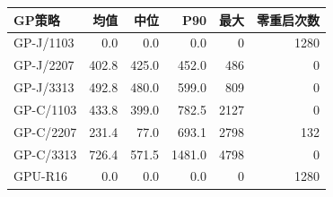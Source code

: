 \begin{tabular}{@{}lrrrrr@{}}
\toprule
GP策略 & 均值 & 中位 & P90 & 最大 & 零重启次数 \\ \midrule
GP-J/1103 & 0.0 & 0.0 & 0.0 & 0 & 1280 \\
GP-J/2207 & 402.8 & 425.0 & 452.0 & 486 & 0 \\
GP-J/3313 & 492.8 & 480.0 & 599.0 & 809 & 0 \\
GP-C/1103 & 433.8 & 399.0 & 782.5 & 2127 & 0 \\
GP-C/2207 & 231.4 & 77.0 & 693.1 & 2798 & 132 \\
GP-C/3313 & 726.4 & 571.5 & 1481.0 & 4798 & 0 \\
GPU-R16 & 0.0 & 0.0 & 0.0 & 0 & 1280 \\
\bottomrule
\end{tabular}
